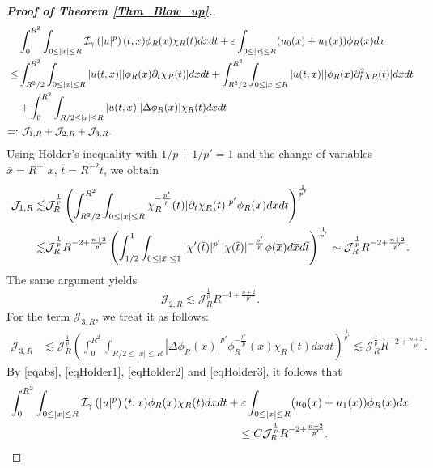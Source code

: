 \documentclass[11pt,reqno]{amsart}
\begin{document}
\begin{proof}[\textbf{Proof of Theorem \ref{Thm_Blow_up}.}]
\begin{align}
&\int_0^{R^2}\int_{0 \leq |x| \leq R} \mathcal{I}_{\gamma} \left(|u|^p\right)(t,x)\phi_R(x)\chi_R(t)dxdt+\varepsilon\int_{0 \leq |x| \leq R}(u_0(x)+u_1(x))\phi_R(x)dx \notag\\
\leq & \int_{R^2/2}^{R^2}\int_{0 \leq |x| \leq R} |u(t, x)| |\phi_R(x) \partial_t\chi_R(t)|dxdt+\int_{R^2/2}^{R^2}\int_{0 \leq |x| \leq R} |u(t, x)||\phi_R(x) \partial_t^2\chi_R(t)|dxdt \notag\\
&+
\int_0^{R^2}\int_{R/2 \leq |x| \leq R}|u(t, x)||\Delta \phi_R(x)|\chi_R(t)dxdt \notag\\
=:&\,\,\mathcal{J}_{1,R} + \mathcal{J}_{2,R} + \mathcal{J}_{3,R}. \label{eqabs}
\end{align}
Using H\"older's inequality with $1/p + 1/p' = 1$ and the change of
variables $\overline{x}=R^{-1}x$, $\overline{t}=R^{-2}t$, we obtain
\begin{align}
\mathcal{J}_{1,R}
\lesssim & \mathcal{J}_R^{\frac{1}{p
}}\left(\int_{R^2/2}^{R^2}\int_{0 \leq |x| \leq R}\chi^{-\frac{p'}{p}}_R(t) |\partial_t\chi_R(t)|^{p'}\phi_R(x)dxdt\right)^{\frac{1}{p'}} \notag\\
\lesssim& \mathcal{J}_R^{\frac{1}{p}}R^{-2+\frac{n+2}{p'}} \left(\int_{1/2}^{1}\int_{0 \leq |\bar{x}| \leq 1} |\chi^{\prime}(\overline{t})|^{p'}|\chi(\overline{t})|^{-\frac{p^{\prime}}{p}}\phi(\overline{x}) d\overline{x}d\overline{t}\right)^{\frac{1}{p'}} \sim \mathcal{J}_R^{\frac{1}{p}}R^{-2+\frac{n+2}{p'}}.\label{eqHolder1}
\end{align}
The same argument yields
\begin{equation}\label{eqHolder2}
\mathcal{J}_{2,R} \lesssim \mathcal{J}_R^{\frac{1}{p}}R^{-4+\frac{n+2}{p'}}.
\end{equation}
For the term $\mathcal{J}_{3,R}$, we treat it as follows:
\begin{align}
\mathcal{J}_{3,R}
&\lesssim \mathcal{J}_R^{\frac{1}{p}}
\left(\int_0^{R^2}\int_{R/2 \leq |x| \leq R} |\Delta\phi_R(x)|^{p'} \phi_R^{-\frac{p'}{p}}(x)\chi_R(t)dxdt\right)^{\frac{1}{p'}} \lesssim \mathcal{J}_R^{\frac{1}{p}}R^{-2+\frac{n+2}{p'}}. \label{eqHolder3}
\end{align}
By \eqref{eqabs}, \eqref{eqHolder1}, \eqref{eqHolder2} and \eqref{eqHolder3}, it follows that
\begin{align} \label{I_u^p}
\int_0^{R^2}\int_{0 \leq |x| \leq R} \mathcal{I}_{\gamma} \left(|u|^p\right)(t,x)\phi_R(x)\chi_R(t)dxdt &+\varepsilon\int_{0 \leq |x| \leq R}(u_0(x)+u_1(x))\phi_{R}(x)dx\notag\\ &\quad\leq C \mathcal{J}_R^{\frac{1}{p}}R^{-2+\frac{n+2}{p'}}.

\end{align}
\end{proof}
\end{document}
